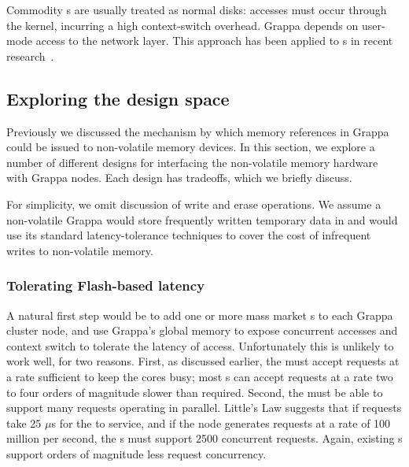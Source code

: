  Commodity \hspace{0.75pt}s are usually treated
as normal disks: accesses must occur through the kernel, incurring a
high context-switch overhead. Grappa depends on user-mode access to
the network layer. This approach has been applied to \hspace{0.75pt}s in recent research~\cite{caulfield:2012}.

\subsection{Exploring the design space}

Previously we discussed the mechanism by which memory references in
Grappa could be issued to non-volatile memory devices. In this
section, we explore a number of different designs for interfacing the
non-volatile memory hardware with Grappa nodes. Each design has
tradeoffs, which we briefly discuss.

For simplicity, we omit discussion of write and erase operations. We
assume a non-volatile Grappa would store frequently written temporary
data in  and would use its standard latency-tolerance techniques
to cover the cost of infrequent writes to non-volatile memory.

\subsubsection{Tolerating Flash-based  latency} 
A natural first step would be to add one or more mass market \hspace{0.75pt}s to each Grappa
cluster node, and use Grappa's global memory  to expose concurrent
accesses and context switch to tolerate the latency of 
access. Unfortunately this is unlikely to work well, for two
reasons. First, as discussed earlier, the  must accept requests at a rate sufficient to
keep the cores busy; most \hspace{0.75pt}s
can accept requests at a rate two to four orders of magnitude slower than required.
Second, the  must be able to support many requests operating in
parallel. Little's Law suggests that if requests take 25 $\mu$s for
the  to service, and if the node generates requests at a rate of
100 million per second, the \hspace{0.75pt}s must support 2500 concurrent
requests. Again, existing \hspace{0.75pt}s support orders of magnitude less request concurrency.


